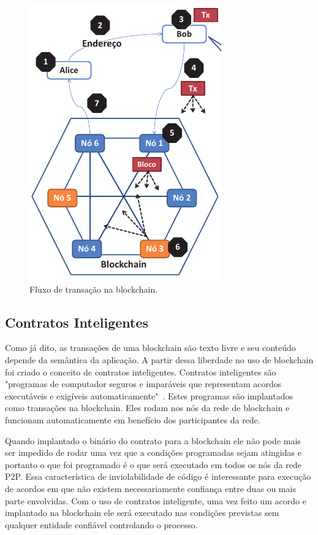 \documentclass[12pt]{article}
\begin{document}
\begin{figure}[H]
    \centering
    \includegraphics[scale=0.7]{Imagens/passos_transação.png}
    \caption{Fluxo de transação na blockchain.}
    \label{fig:transacao_blockchain}
\end{figure}

\subsection{Contratos Inteligentes}

Como já dito, as transações de uma blockchain são texto livre e seu conteúdo depende da semântica da aplicação. A partir dessa liberdade no uso de blockchain foi criado o conceito de contratos inteligentes. Contratos inteligentes são "programas de computador seguros e imparáveis que representam acordos executáveis e exigíveis automaticamente"~\cite{braga2017segurancca}. Estes programas são implantados como transações na blockchain. Eles rodam nos nós da rede de blockchain e funcionam automaticamente em benefício dos participantes da rede. 

Quando implantado o binário do contrato para a blockchain ele não pode mais ser impedido de rodar uma vez que a condições programadas sejam atingidas e portanto o que foi programado é o que será executado em todos os nós da rede P2P. Essa característica de inviolabilidade de código é interessante para execução de acordos em que não existem necessariamente confiança entre duas ou mais parte envolvidas. Com o uso de contratos inteligente, uma vez feito um acordo e implantado na blockchain ele será executado nas condições previstas sem qualquer entidade confiável controlando o processo.
\end{document}

